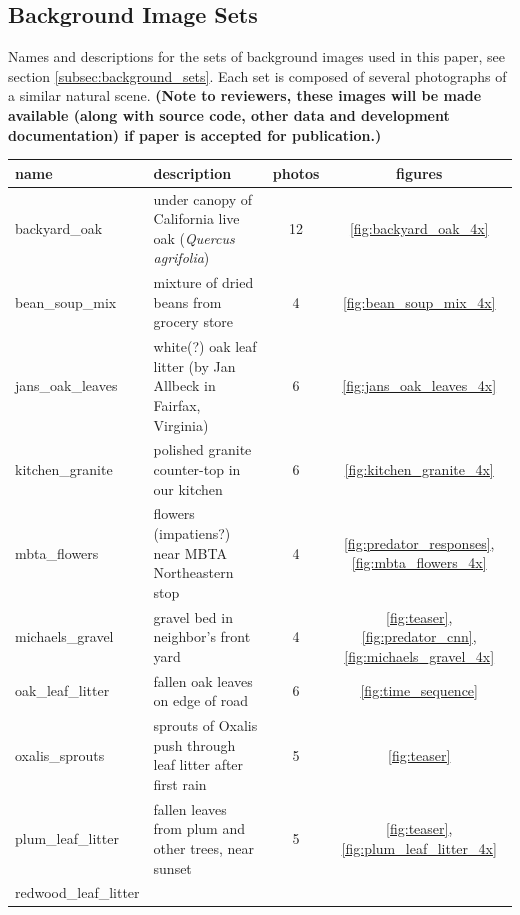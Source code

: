 \documentclass[acmtog,
    anonymous,
    review
    ]{acmart}
\begin{document}
\subsection{Background Image Sets}
\begin{minipage}{\linewidth}
Names and descriptions for the sets of background images used in this paper, see section \ref{subsec:background_sets}. Each set is composed of several photographs of a similar natural scene. \textbf{(Note to reviewers, these images will be made available (along with source code, other data and development documentation) if paper is accepted for publication.)}
\par
\hspace*{1cm}
\begin{minipage}{\linewidth-1.1cm}
\begin{table}[H]
\raggedright 
\begin{tabular}{ |l|l|c|c| }
\hline
\textbf{name} & \textbf{description} & \textbf{photos} & \textbf{figures} \\ 
\hline
backyard\_oak &
    under canopy of California live oak (\textit{Quercus agrifolia}) &
    12 & \ref{fig:backyard_oak_4x} \\
\hline
bean\_soup\_mix &
    mixture of dried beans from grocery store &
    4 & \ref{fig:bean_soup_mix_4x} \\
\hline
jans\_oak\_leaves &
    white(?) oak leaf litter (by Jan Allbeck in Fairfax, Virginia) &
    6 & \ref{fig:jans_oak_leaves_4x} \\
\hline
kitchen\_granite &
    polished granite counter-top in our kitchen &
    6 & \ref{fig:kitchen_granite_4x} \\
\hline
mbta\_flowers &
    flowers (impatiens?) near MBTA Northeastern stop &
    4 & \ref{fig:predator_responses}, \ref{fig:mbta_flowers_4x} \\
\hline
michaels\_gravel &
    gravel bed in neighbor’s front yard &
    4 & \ref{fig:teaser}, \ref{fig:predator_cnn}, \ref{fig:michaels_gravel_4x} \\
\hline
oak\_leaf\_litter &
    fallen oak leaves on edge of road &
    6 & \ref{fig:time_sequence} \\
\hline
oxalis\_sprouts &
    sprouts of Oxalis push through leaf litter after first rain &
    5 & \ref{fig:teaser} \\
\hline
plum\_leaf\_litter &
    fallen leaves from plum and other trees, near sunset &
    5 & \ref{fig:teaser}, \ref{fig:plum_leaf_litter_4x} \\
\hline
redwood\_leaf\_litter &

\end{tabular}
\end{table}
\end{minipage}
\end{minipage}
\end{document}
